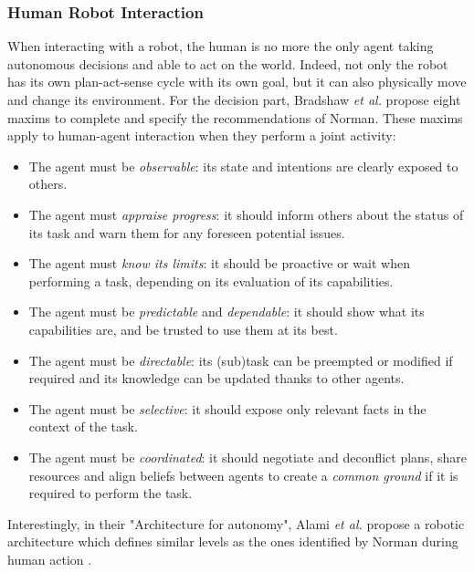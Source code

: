 \documentclass[a4paper,11pt,twoside]{StyleThese}
\begin{document}
\subsubsection{Human Robot Interaction}
When interacting with a robot, the human is no more the only agent taking autonomous decisions and able to act on the world. Indeed, not only the robot has its own plan-act-sense cycle with its own goal, but it can also physically move and change its environment. For the decision part, Bradshaw \textit{et al.} \cite{bradshaw2011human} propose eight maxims to complete and specify the recommendations of Norman. These maxims apply to human-agent interaction when they perform a joint activity:
\begin{itemize}
\item The agent must be \textit{observable}: its state and intentions are clearly exposed to others.
\item The agent must \textit{appraise progress}: it should inform others about the status of its task and warn them for any foreseen potential issues.
\item The agent must \textit{know its limits}: it should be proactive or wait when performing a task, depending on its evaluation of its capabilities.
\item The agent must be \textit{predictable} and \textit{dependable}: it should show what its capabilities are, and be trusted to use them at its best.
\item The agent must be \textit{directable}: its (sub)task can be preempted or modified if required and its knowledge can be updated thanks to other agents.
\item The agent must be \textit{selective}: it should expose only relevant facts in the context of the task.
\item The agent must be \textit{coordinated}: it should negotiate and deconflict plans, share resources and align beliefs between agents to create a \textit{common ground} if it is required to perform the task.
\end{itemize}


Interestingly, in their "Architecture for autonomy", Alami \textit{et al.} propose a robotic architecture which defines similar levels as the ones identified by Norman during human action \cite{alami1998architecture}.
\end{document}
